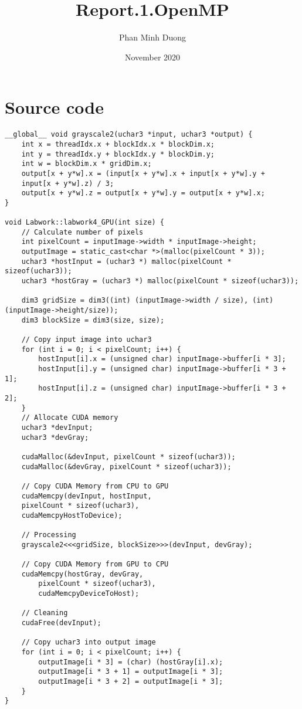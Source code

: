 \documentclass{article}
\title{Report.1.OpenMP}
\author{Phan Minh Duong}
\date{November 2020}
\begin{document}
\maketitle

\section{Source code}
\begin{verbatim}
__global__ void grayscale2(uchar3 *input, uchar3 *output) {
    int x = threadIdx.x + blockIdx.x * blockDim.x;
    int y = threadIdx.y + blockIdx.y * blockDim.y;
    int w = blockDim.x * gridDim.x;
    output[x + y*w].x = (input[x + y*w].x + input[x + y*w].y +
    input[x + y*w].z) / 3;
    output[x + y*w].z = output[x + y*w].y = output[x + y*w].x;
}

void Labwork::labwork4_GPU(int size) {
    // Calculate number of pixels
    int pixelCount = inputImage->width * inputImage->height;
    outputImage = static_cast<char *>(malloc(pixelCount * 3));
    uchar3 *hostInput = (uchar3 *) malloc(pixelCount * sizeof(uchar3));
    uchar3 *hostGray = (uchar3 *) malloc(pixelCount * sizeof(uchar3));
    
    dim3 gridSize = dim3((int) (inputImage->width / size), (int) (inputImage->height/size));
    dim3 blockSize = dim3(size, size);

    // Copy input image into uchar3
    for (int i = 0; i < pixelCount; i++) {
        hostInput[i].x = (unsigned char) inputImage->buffer[i * 3];
        hostInput[i].y = (unsigned char) inputImage->buffer[i * 3 + 1];
        hostInput[i].z = (unsigned char) inputImage->buffer[i * 3 + 2];
    }
    // Allocate CUDA memory  
    uchar3 *devInput;
    uchar3 *devGray;

    cudaMalloc(&devInput, pixelCount * sizeof(uchar3));
    cudaMalloc(&devGray, pixelCount * sizeof(uchar3));

    // Copy CUDA Memory from CPU to GPU
    cudaMemcpy(devInput, hostInput,
    pixelCount * sizeof(uchar3),
    cudaMemcpyHostToDevice);

    // Processing
    grayscale2<<<gridSize, blockSize>>>(devInput, devGray);

    // Copy CUDA Memory from GPU to CPU
    cudaMemcpy(hostGray, devGray,
        pixelCount * sizeof(uchar3),
        cudaMemcpyDeviceToHost);

    // Cleaning
    cudaFree(devInput);

    // Copy uchar3 into output image
    for (int i = 0; i < pixelCount; i++) {
        outputImage[i * 3] = (char) (hostGray[i].x);
        outputImage[i * 3 + 1] = outputImage[i * 3];
        outputImage[i * 3 + 2] = outputImage[i * 3];
    }
}
\end{verbatim}
\end{document}
